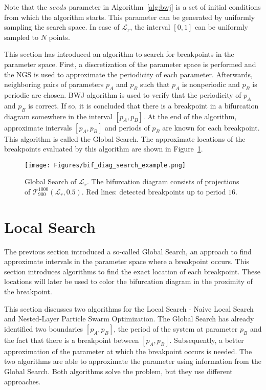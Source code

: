Note that the $seeds$ parameter in Algorithm~\ref{alg:bwj} is a set of initial conditions from which the algorithm starts.
This parameter can be generated by uniformly sampling the search space.
In case of $\mathcal{L}_{r}$, the interval $[0, 1]$ can be uniformly sampled to $N$ points.

\bigskip
This section has introduced an algorithm to search for breakpoints in the parameter space.
First, a discretization of the parameter space is performed and the NGS is used to approximate the periodicity of each parameter.
Afterwards, neighboring pairs of parameters $p_{A}$ and $p_{B}$ such that $p_{A}$ is nonperiodic and $p_{B}$ is periodic are chosen.
BWJ algorithm is used to verify that the periodicity of $p_{A}$ and $p_{B}$ is correct.
If so, it is concluded that there is a breakpoint in a bifurcation diagram somewhere in the interval $[p_{A}, p_{B}]$.
At the end of the algorithm, approximate intervals $[p_{A}, p_{B}]$ and periods of $p_{B}$ are known for each breakpoint.
This algorithm is called the Global Search.
The approximate locations of the breakpoints evaluated by this algorithm are shown in Figure~\ref{fig:bif_diag_search_example}.

\begin{figure}[!h]
    \centering
    \texttt{[image: Figures/bif\_diag\_search\_example.png]}
    \caption{
        Global Search of $\mathcal{L}_{r}$.
        The bifurcation diagram consists of projections of $\mathcal{T}_{900}^{1000}(\mathcal{L}_{r}, 0.5)$.
        Red lines: detected breakpoints up to period $16$.
    }
    \label{fig:bif_diag_search_example}
\end{figure}

\section{Local Search}

The previous section introduced a so-called Global Search, an approach to find approximate intervals in the parameter space where a breakpoint occurs.
This section introduces algorithms to find the exact location of each breakpoint.
These locations will later be used to color the bifurcation diagram in the proximity of the breakpoint.
\par
This section discusses two algorithms for the Local Search - Naive Local Search and Nested-Layer Particle Swarm Optimization.
The Global Search has already identified two boundaries $[p_A, p_B]$, the period of the system at parameter $p_B$ and the fact that there is a breakpoint between $[p_A, p_B]$.
Subsequently, a better approximation of the parameter at which the breakpoint occurs is needed.
The two algorithms are able to approximate the parameter using information from the Global Search.
Both algorithms solve the problem, but they use different approaches.

